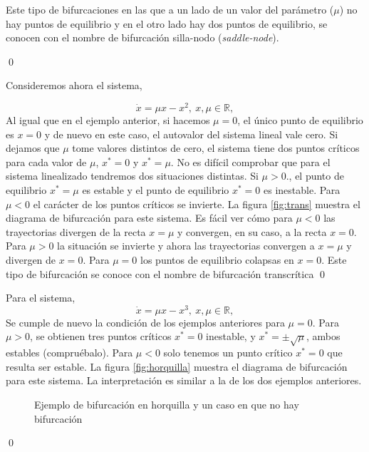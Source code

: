 \begin{example}
Este tipo de bifurcaciones en las que a un lado de un valor del parámetro ($\mu$) no hay puntos de equilibrio y en el otro lado hay dos puntos de equilibrio, se conocen con el nombre de bifurcación silla-nodo (\emph{saddle-node}).  

\qed
\end{example}

\begin{example} Consideremos ahora el sistema,

\begin{equation*}
\dot x = \mu x - x^2,\  x, \mu \in \mathbb{R},  
\end{equation*}
Al igual que en el ejemplo anterior, si hacemos $\mu=0$, el único punto de equilibrio es $x=0$ y de nuevo en este caso, el autovalor del sistema lineal vale cero. Si dejamos que $\mu$ tome valores distintos de cero, el sistema tiene dos puntos críticos para cada valor de $\mu$, $x^*=0$ y $x^*=\mu$. No es difícil comprobar que para el sistema linealizado tendremos dos situaciones distintas. Si $\mu>0$., el punto de equilibrio $x^*=\mu$ es estable y el punto de equilibrio $x^*=0$ es inestable. Para $\mu<0$ el carácter de los puntos críticos se invierte. La figura \ref{fig:trans} muestra el diagrama de bifurcación para este sistema.  Es fácil ver cómo para $\mu<0$ las trayectorias divergen de la recta $x=\mu$ y convergen, en su caso, a la recta $x=0$. Para $\mu>0$ la situación se invierte y ahora las trayectorias convergen a $x=\mu$ y divergen de $x=0$. Para $\mu=0$ los puntos de equilibrio colapsas en $x=0$. Este tipo de bifurcación se conoce con el nombre de bifurcación transcrítica
\qed
\end{example}
 
\begin{example}
Para el sistema,
\begin{equation*}
\dot x = \mu x - x^3,\  x, \mu \in \mathbb{R},  
\end{equation*}
Se cumple de nuevo la condición de los ejemplos anteriores para $\mu=0$. Para $\mu>0$, se obtienen tres puntos críticos $x^*=0$ inestable, y $x^*=\pm\sqrt{\mu}$, ambos estables (compruébalo). Para $\mu<0$ solo tenemos un punto crítico $x^*=0$ que resulta ser estable. La figura \ref{fig:horquilla} muestra el diagrama de bifurcación para este sistema. La interpretación es similar a la de los dos ejemplos anteriores.
\begin{figure}
\label{fig:horquilla}
\label{fig:nobif}
\caption{Ejemplo de bifurcación en horquilla y un caso en que no hay bifurcación}
\end{figure}

\qed
\end{example}
 
